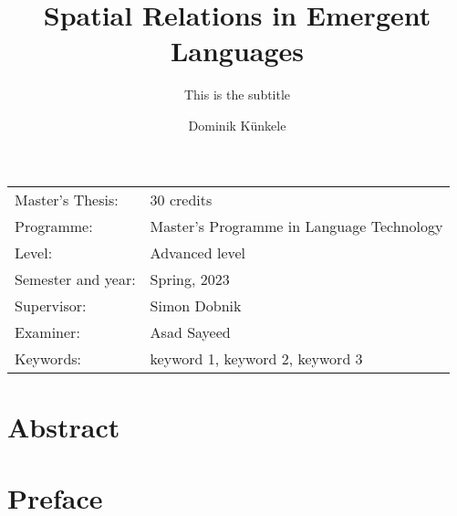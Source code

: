 \documentclass[11pt, a4paper]{article}
\title{Spatial Relations in Emergent Languages}
\subtitle{This is the subtitle}
\author{Dominik Künkele}
\begin{document}
\begin{titlepage}

    \maketitle

    \vfill

    \begingroup
    \renewcommand*{\arraystretch}{1.2}
    \begin{tabular}{l@{\hskip 20mm}l}
        \hline
        Master's Thesis:   & 30 credits                                \\
        Programme:         & Master’s Programme in Language Technology \\
        Level:             & Advanced level                            \\
        Semester and year: & Spring, 2023                              \\
        Supervisor:        & Simon Dobnik                              \\
        Examiner:          & Asad Sayeed                               \\
        Keywords:          & keyword 1, keyword 2, keyword 3
    \end{tabular}
    \endgroup

    \thispagestyle{empty}
\end{titlepage}

\newpage
\singlespacing
\section*{Abstract}


\thispagestyle{empty}

\newpage
\section*{Preface}



\thispagestyle{empty}
\end{document}
